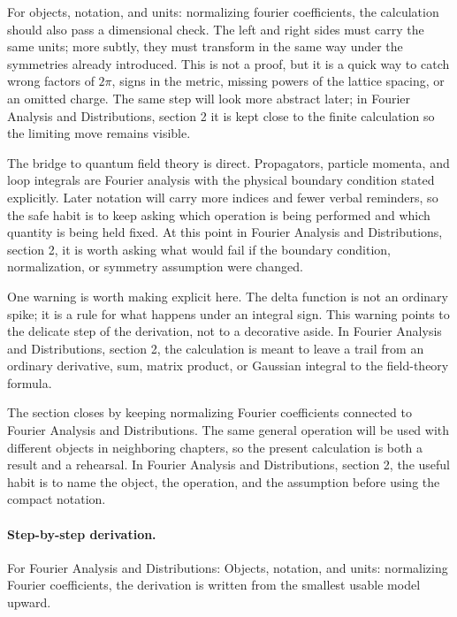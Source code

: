 For objects, notation, and units: normalizing fourier coefficients, the calculation should also pass a dimensional check.  The left and right sides must carry the same units; more subtly, they must transform in the same way under the symmetries already introduced.  This is not a proof, but it is a quick way to catch wrong factors of \(2\pi\), signs in the metric, missing powers of the lattice spacing, or an omitted charge.  The same step will look more abstract later; in Fourier Analysis and Distributions, section 2 it is kept close to the finite calculation so the limiting move remains visible.

The bridge to quantum field theory is direct.  Propagators, particle momenta, and loop integrals are Fourier analysis with the physical boundary condition stated explicitly.  Later notation will carry more indices and fewer verbal reminders, so the safe habit is to keep asking which operation is being performed and which quantity is being held fixed.  At this point in Fourier Analysis and Distributions, section 2, it is worth asking what would fail if the boundary condition, normalization, or symmetry assumption were changed.

One warning is worth making explicit here.  The delta function is not an ordinary spike; it is a rule for what happens under an integral sign.  This warning points to the delicate step of the derivation, not to a decorative aside.  In Fourier Analysis and Distributions, section 2, the calculation is meant to leave a trail from an ordinary derivative, sum, matrix product, or Gaussian integral to the field-theory formula.

The section closes by keeping normalizing Fourier coefficients connected to Fourier Analysis and Distributions.  The same general operation will be used with different objects in neighboring chapters, so the present calculation is both a result and a rehearsal.  In Fourier Analysis and Distributions, section 2, the useful habit is to name the object, the operation, and the assumption before using the compact notation.



\paragraph{Step-by-step derivation.}

For Fourier Analysis and Distributions: Objects, notation, and units: normalizing Fourier coefficients, the derivation is written from the smallest usable model upward.

